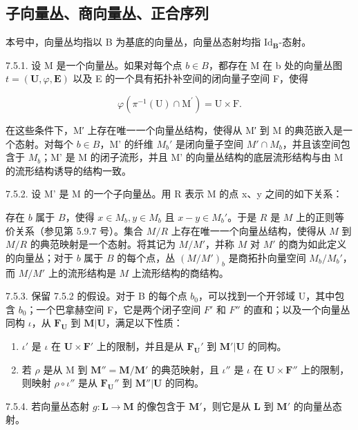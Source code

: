 \subsection{子向量丛、商向量丛、正合序列}

本号中，向量丛均指以 B 为基底的向量丛，向量丛态射均指 \(\mathrm{Id}_{\mathbf{B}}\)-态射。

7.5.1. 设 M 是一个向量丛。如果对每个点 \(b \in B\)，都存在 M 在 b 处的向量丛图 \(t = (\mathbf{U}, \varphi, \mathbf{E})\) 以及 E 的一个具有拓扑补空间的闭向量子空间 F，使得

\[
\varphi (\pi^ {- 1} (\mathrm{U}) \cap \mathrm{M} ^ {\prime}) = \mathrm{U} \times \mathrm{F}.
\]

在这些条件下，M′ 上存在唯一一个向量丛结构，使得从 M′ 到 M 的典范嵌入是一个态射。对每个 \(b \in B\)，M' 的纤维 \(M_{b}'\) 是闭向量子空间 \(M' \cap M_{b}\)，并且该空间包含于 \(M_{b}\)；M' 是 M 的闭子流形，并且 M' 的向量丛结构的底层流形结构与由 M 的流形结构诱导的结构一致。

7.5.2. 设 M' 是 M 的一个子向量丛。用 R 表示 M 的点 x、y 之间的如下关系：

存在 \(b\) 属于 \(B\)，使得 \(x \in M_b, y \in M_b\) 且 \(x - y \in M_b'\)。于是 \(R\) 是 \(M\) 上的正则等价关系（参见第 5.9.7 号）。集合 \(M/R\) 上存在唯一一个向量丛结构，使得从 \(M\) 到 \(M/R\) 的典范映射是一个态射。将其记为 \(M/M'\)，并称 \(M\) 对 \(M'\) 的商为如此定义的向量丛；对于 \(b\) 属于 \(B\) 的每个点，丛 \((M/M')_b\) 是商拓扑向量空间 \(M_b/M_b'\)，而 \(M/M'\) 上的流形结构是 \(M\) 上流形结构的商结构。

7.5.3. 保留 7.5.2 的假设。对于 B 的每个点 \(b_0\)，可以找到一个开邻域 U，其中包含 \(b_0\)；一个巴拿赫空间 F，它是两个闭子空间 \(F'\) 和 \(F''\) 的直和；以及一个向量丛同构 \(\iota\)，从 \(\mathbf{F}_{\mathbf{U}}\) 到 \(\mathbf{M}|\mathbf{U}\)，满足以下性质：

\begin{enumerate}
\def\labelenumi{(\roman{enumi})}
\item
  \(\iota'\) 是 \(\iota\) 在 \(\mathbf{U} \times \mathbf{F}'\) 上的限制，并且是从 \(\mathbf{F}_{\mathbf{U}}'\) 到 \(\mathbf{M}'|\mathbf{U}\) 的同构。
\item
  若 \(\rho\) 是从 M 到 \(\mathbf{M}'' = \mathbf{M} / \mathbf{M}'\) 的典范映射，且 \(\iota''\) 是 \(\iota\) 在 \(\mathbf{U} \times \mathbf{F}''\) 上的限制，则映射 \(\rho \circ \iota''\) 是从 \(\mathbf{F}_{\mathbf{U}}''\) 到 \(\mathbf{M}''|\mathbf{U}\) 的同构。
\end{enumerate}

7.5.4. 若向量丛态射 \(g: \mathbf{L} \to \mathbf{M}\) 的像包含于 \(\mathbf{M}'\)，则它是从 \(\mathbf{L}\) 到 \(\mathbf{M}'\) 的向量丛态射。

